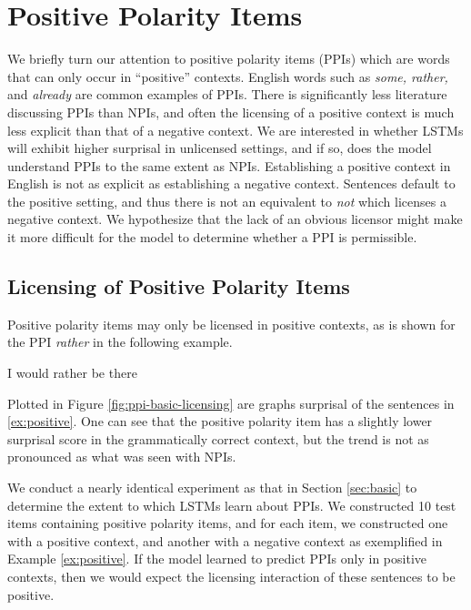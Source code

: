 \documentclass[11pt, round]{article}
\begin{document}
\section{Positive Polarity Items}
We briefly turn our attention to positive polarity items (PPIs) which are words that can only occur in ``positive'' contexts. English words such as \textit{some, rather,} and \textit{already} are common examples of PPIs. There is significantly less literature discussing PPIs than NPIs, and often the licensing of a positive context is much less explicit than that of a negative context. We are interested in whether LSTMs will exhibit higher surprisal in unlicensed settings, and if so, does the model understand PPIs to the same extent as NPIs. Establishing a positive context in English is not as explicit as establishing a negative context. Sentences default to the positive setting, and thus there is not an equivalent to \textit{not} which licenses a negative context. We hypothesize that the lack of an obvious licensor might make it more difficult for the model to determine whether a PPI is permissible.

\subsection{Licensing of Positive Polarity Items}
Positive polarity items may only be licensed in positive contexts, as is shown for the PPI \textit{rather} in the following example.
\begin{exe}
\ex \label{ex:positive}
\begin{xlist}
\ex I would rather be there


\end{xlist}
\end{exe}
Plotted in Figure \ref{fig:ppi-basic-licensing} are graphs surprisal of the sentences in \ref{ex:positive}. One can see that the positive polarity item has a slightly lower surprisal score in the grammatically correct context, but the trend is not as pronounced as what was seen with NPIs.

We conduct a nearly identical experiment as that in Section \ref{sec:basic} to determine the extent to which LSTMs learn about PPIs. We constructed 10 test items containing positive polarity items, and for each item, we constructed one with a positive context, and another with a negative context as exemplified in Example \ref{ex:positive}. If the model learned to predict PPIs only in positive contexts, then we would expect the licensing interaction of these sentences to be positive.
\end{document}
